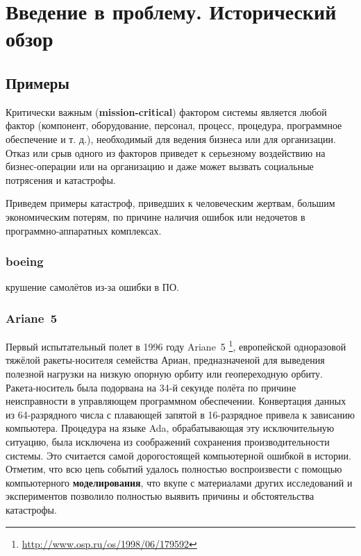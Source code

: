 \chapter{Введение в проблему. Исторический обзор}\label{ch:ch1}

\section{Примеры}
Критически важным (\textbf{mission-critical}) фактором системы является любой фактор
(компонент, оборудование, персонал, процесс, процедура, программное обеспечение и т. д.),
необходимый для ведения бизнеса или для организации.
Отказ или срыв одного из факторов приведет к серьезному воздействию на бизнес-операции или на организацию
и даже может вызвать социальные потрясения и катастрофы.

Приведем примеры катастроф, приведших к человеческим жертвам, большим экономическим потерям,
по причине наличия ошибок или недочетов в программно-аппаратных комплексах.

\subsection{boeing}

крушение самолётов из-за ошибки в ПО.


\subsection{Ariane~5}

    Первый испытательный полет в 1996 году Ariane~5 \cite{journal:open_system:1998_adjaev}\footnote{\url{http://www.osp.ru/os/1998/06/179592}},
    европейской одноразовой тяжёлой ракеты-носителя семейства Ариан,
    предназначеной для выведения полезной нагрузки на низкую опорную орбиту или геопереходную орбиту. 
    Ракета-носитель была подорвана на 34-й секунде полёта по причине неисправности в управляющем программном обеспечении.
    Конвертация данных из 64-разрядного числа с плавающей запятой в 16-разрядное привела к зависанию компьютера.
    Процедура на языке Ada, обрабатывающая эту исключительную ситуацию, была исключена из соображений сохранения производительности системы.
    Это считается самой дорогостоящей компьютерной ошибкой в истории.
    Отметим, что всю цепь событий удалось полностью воспроизвести с помощью компьютерного \textbf{моделирования}, что вкупе с материалами других исследований и экспериментов позволило полностью выявить причины и обстоятельства катастрофы.
